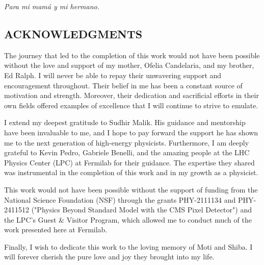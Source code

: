


\vspace*{2in}
\begin{center}
	\emph{Para mi mamá y mi hermano.}
\end{center}

\newpage


\vspace*{0.5in}
\begin{center}
	\section*{ACKNOWLEDGMENTS}
\end{center}



\noindent The journey that led to the completion of this work would not have been possible without the love and support of my mother, Ofelia Candelaria, and my brother, Ed Ralph. I will never be able to repay their unwavering support and encouragement throughout. Their belief in me has been a constant source of motivation and strength. Moreover, their dedication and sacrificial efforts in their own fields offered examples of excellence that I will continue to strive to emulate.

I extend my deepest gratitude to Sudhir Malik. His guidance and mentorship have been invaluable to me, and I hope to pay forward the support he has shown me to the next generation of high-energy physicists. Furthermore, I am deeply grateful to Kevin Pedro, Gabriele Benelli, and the amazing people at the LHC Physics Center (LPC) at Fermilab for their guidance. The expertise they shared was instrumental in the completion of this work and in my growth as a physicist.

This work would not have been possible without the support of funding from the National Science Foundation (NSF) through the grants PHY-2111134 and PHY-2411512 ("Physics Beyond Standard Model with the CMS Pixel Detector") and the LPC's Guest \& Visitor Program, which allowed me to conduct much of the work presented here at Fermilab.

Finally, I wish to dedicate this work to the loving memory of Moti and Shiba. I will forever cherish the pure love and joy they brought into my life. 

